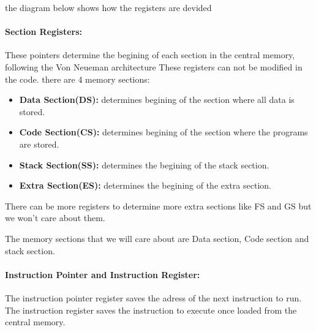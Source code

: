 \documentclass[10pt]{article}
\begin{document}
    the diagram below shows how the registers are devided
    \paragraph{Section Registers: }These pointers determine the begining of each section in the central memory, 
    following the Von Neueman architecture
    These registers can not be modified in the code.
    there are 4 memory sections:
    \begin{itemize}
        \item \textbf{Data Section(DS): }determines begining of the section where all data is stored.
        \item \textbf{Code Section(CS): }determines begining of the section where the programs are stored.
        \item \textbf{Stack Section(SS): }determines the begining of the stack section.
        \item \textbf{Extra Section(ES): }determines the begining of the extra section.
    \end{itemize}
    There can be more registers to determine more extra sections like FS and GS but we won't care about them.

    The memory sections that we will care about are Data section, Code section and stack section.

    \paragraph{Instruction Pointer and Instruction Register: }The instruction pointer register saves the adress of the next instruction to run.
    The instruction register saves the instruction to execute once loaded from the central memory.
\end{document}
